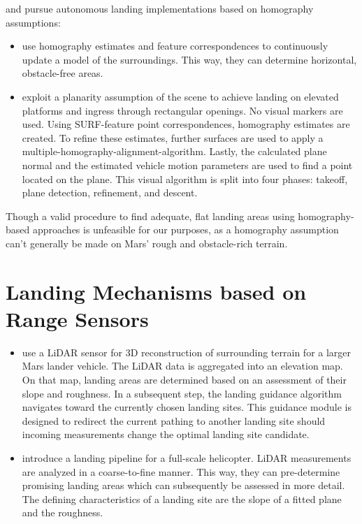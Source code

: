 \citep{Bosch2006AutonomousDetection,Brockers2011AutonomousLanding,Desaraju2015VisionBased} and \citep{Brockers2014TowardsAutonomous} pursue autonomous landing implementations based on homography assumptions: 

\begin{itemize}
    \item \citet{Bosch2006AutonomousDetection} use homography estimates and feature correspondences to continuously update a model of the surroundings. This way, they can determine horizontal, obstacle-free areas. 
    \item \citet{Brockers2011AutonomousLanding} exploit a planarity assumption of the scene to achieve landing on elevated platforms and ingress through rectangular openings. No visual markers are used. Using SURF-feature point correspondences, homography estimates are created. To refine these estimates, further surfaces are used to apply a multiple-homography-alignment-algorithm. Lastly, the calculated plane normal and the estimated vehicle motion parameters are used to find a point located on the plane. This visual algorithm is split into four phases: takeoff, plane detection, refinement, and descent.
\end{itemize}

Though a valid procedure to find adequate, flat landing areas using homography-based approaches is unfeasible for our purposes, as a homography assumption can't generally be made on Mars' rough and obstacle-rich terrain.  


\section{Landing Mechanisms based on Range Sensors}

\begin{itemize}
    \item \citet{Johnson2002LidarBased} use a LiDAR sensor for 3D reconstruction of surrounding terrain for a larger Mars lander vehicle. The LiDAR data is aggregated into an elevation map. On that map, landing areas are determined based on an assessment of their slope and roughness. In a subsequent step, the landing guidance algorithm navigates toward the currently chosen landing sites. This guidance module is designed to redirect the current pathing to another landing site should incoming measurements change the optimal landing site candidate.
    \item \citet{Scherer2012AutonomousLanding} introduce a landing pipeline for a full-scale helicopter. LiDAR measurements are analyzed in a coarse-to-fine manner. This way, they can pre-determine promising landing areas which can subsequently be assessed in more detail. The defining characteristics of a landing site are the slope of a fitted plane and the roughness.
\end{itemize}

